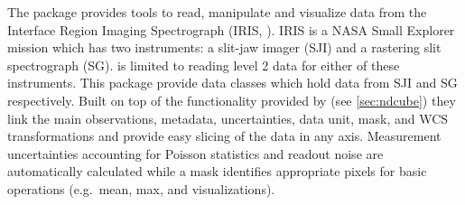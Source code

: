 The  package provides tools to read, manipulate and visualize data from the Interface Region Imaging Spectrograph (IRIS, \citealt{DePontieu2014}).
IRIS is a NASA Small Explorer mission which has two instruments: a slit-jaw imager (SJI) and a rastering slit spectrograph (SG).
 is limited to reading level 2 data for either of these instruments.
This package provide data classes which hold data from SJI and SG respectively.
Built on top of the functionality provided by  (see \autoref{sec:ndcube}) they link the main observations, metadata, uncertainties, data unit, mask, and WCS transformations and provide easy slicing of the data in any axis.
Measurement uncertainties accounting for Poisson statistics and readout noise are automatically calculated while a mask identifies appropriate pixels for basic operations (e.g.\ mean, max, and visualizations).

